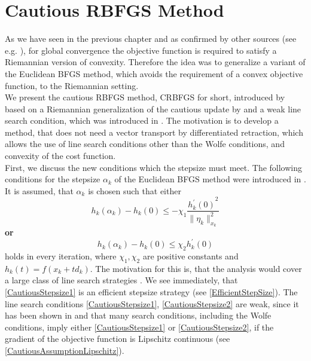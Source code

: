 \section{Cautious RBFGS Method}
\label{Section4.5}

As we have seen in the previous chapter and as confirmed by other sources (see e.g. \cite{RingWirth:2012}), for global convergence the objective function is required to satisfy a Riemannian version of convexity. Therefore the idea was to generalize a variant of the Euclidean BFGS method, which avoids the requirement of a convex objective function, to the Riemannian setting. \\
We present the cautious RBFGS method, CRBFGS for short, introduced by \cite{HuangAbsilGallivan:2018} based on a Riemannian generalization of the cautious update by \cite{LiFukushima:2001} and a weak line search condition, which was introduced in \cite{ByrdNocedal:1989}. The motivation is to develop a method, that does not need a vector transport by differentiated retraction, which allows the use of line search conditions other than the Wolfe conditions, and convexity of the cost function. \\
First, we discuss the new conditions which the stepsize must meet. The following conditions for the stepsize $\alpha_k$ of the Euclidean BFGS method were introduced in \cite{ByrdNocedal:1989}. It is assumed, that $\alpha_k$ is chosen such that either
\begin{equation}\label{CautiousStepsize1}
    h_k(\alpha_k) - h_k(0) \leq - \chi_1 \frac{{h^{\prime}_k(0)}^2}{\lVert \eta_k \rVert^2_{x_k}}
\end{equation}
\textbf{or}
\begin{equation}\label{CautiousStepsize2}
    h_k(\alpha_k) - h_k(0) \leq \chi_2 h^{\prime}_k(0)
\end{equation}
holds in every iteration, where $\chi_1, \chi_2$ are positive constants and $h_k(t) = f(x_k + td_k)$. The motivation for this is, that the analysis would cover a large class of line search strategies \cite[p.~732]{ByrdNocedal:1989}. We see immediately, that \cref{CautiousStepsize1} is an efficient stepsize strategy (see \cref{EfficientStepSize}). The line search conditions \cref{CautiousStepsize1}, \cref{CautiousStepsize2} are weak, since it has been shown in \cite{ByrdNocedal:1989} and \cite{Werner:1978} that many search conditions, including the Wolfe conditions, imply either \cref{CautiousStepsize1} or \cref{CautiousStepsize2}, if the gradient of the objective function is Lipschitz continuous (see \cref{CautiousAssumptionLipschitz}). \\
